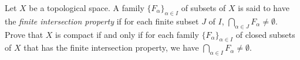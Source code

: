 \begin{comment}

\ExerciseSolution First, suppose that $A$ is a compact subset of $X$. To show that $(A, \tau_A)$ is a compact space, let $\{O_{\alpha}\}$, for $\alpha$ in some indexing set $I$, be an open cover of $A$ in the subspace topology. Then, for each $\alpha \in I$ there exists an open set $U_{\alpha}$ of $X$ such that $O_{\alpha} = U_{\alpha} \cap A$. Since $A \subseteq \bigcap_{\alpha \in I} O_{\alpha}$ it follows that $A \subseteq \bigcap_{\alpha \in I} U_{\alpha}$. The fact that $A$ is a compact subset of $X$ implies that there is a finite subcover $\{U_i\}_{i = 1|^n$ for $A$ of the open cover $\{U_{\alpha}\}_{\alpha \in I}$. So $A \subseteq \bigcap_{1 \leq i \leq n} U_{i}$. From this we have $A =  \bigcap_{1 \leq i \leq n} (U_{i} \cap A) = \bigcap_{1 \leq i \leq n} O_{i}$ and we have found a finite subcover for $A$ of the open cover $\{O_{\alpha}\}$. We conclude that $(A, \tau_A)$ is a compact topological space. 

For the reverse implication, assume that $A$ is a compact topological space. To prove that $A$ is a compact subset of $X$, let $\{U_{\alpha}\}$, for $\alpha$ in some indexing set $I$, be an open cover of $A$ in $(X, \tau_X)$. For each $\alpha \in I$, let $O_{\alpha} = U_{\alpha} \cap A$. Then $O_{\alpha$ \in \tau_A$ for each $\alpha in I$ and $A = \bigcup_{\alpha in I} O_{\alpha}$. But $(A, \tau_A)$ is a compact topological space, so there is a finite subcover $\{O_i\}_{1 \leq i \leq n}$ for $A$ of $\{O_{\alpha}\}_{\alpha \in I}$. That is, $A = \bigcup_{1 \leq i \leq n} O_i = \bigcup_{1 \leq i \leq n} (U_i \cap A)$. so $A \subseteq \bigcup_{1 \leq i \leq n} U_i$, and there is a finite subcover for $A$ of the open cover $\{U_{\alpha}\}$. We conclude that $A$ is a compact subset of $X$. 

\end{comment}


\item Let $X$ be a topological space. A family $\{F_{\alpha}\}_{\alpha \in I}$ of subsets of $X$ is said to have the \emph{finite intersection property} if for each finite subset $J$ of $I$, $\bigcap_{\alpha \in J} F_{\alpha} \neq \emptyset$. Prove that $X$ is compact if and only if for each family $\{F_{\alpha}\}_{\alpha \in I}$ of closed subsets of $X$ that has the finite intersection property, we have $\bigcap_{\alpha \in I} F_{\alpha} \neq \emptyset$. 

